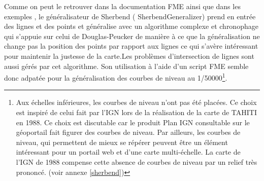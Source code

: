 Comme on peut le retrouver dans la documentation FME ainsi que dans les exemples \cite{sherbend}, le généralisateur de Sherbend ( SherbendGeneralizer) prend en entrée des lignes et des points et généralise avec un algorithme complexe et chronophage qui s'appuie sur celui de Douglas-Peucker de manière à ce que la généralisation ne change pas la position des points par rapport aux lignes ce qui s'avère intéressant pour maintenir la justesse de la carte.Les problèmes d'intersection de lignes sont aussi gérés par cet algorithme. Son utilisation à l'aide d'un script FME semble donc adpatée pour la généralisation des courbes de niveau au 1/50000\footnote{Aux échelles inférieures, les courbes de niveau n'ont pas été placées. Ce choix est inspiré de celui fait par l'IGN lors de la réalisation de la carte de TAHITI en 1988. Ce choix est discutable car le produit Plan IGN consultable sur le géoportail fait figurer des courbes de niveau. Par ailleurs, les courbes de niveau, qui permettent de mieux se répérer peuvent être un élément intéressant pour un portail web et d'une carte multi-échelle. La carte de l'IGN de 1988 compense cette absence de courbes de niveau par un relief très prononcé. (voir annexe \ref{sherbend})}.


